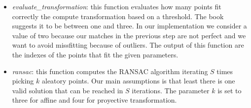 \begin{itemize}
	\item \textit{evaluate\_transformation}: this function evaluates how many points fit correctly the compute transformation based on a threshold. The book suggests it to be between one and three. In our implementation we consider a value of two because our matches in the previous step are not perfect and we want to avoid missfitting because of outliers. The output of this function are the indexes of the points that fit the given parameters.

	\item \textit{ransac}: this function computes the RANSAC algorithm iterating $S$ times picking $k$ aleatory points. Our main assumptions is that least there is one valid solution that can be reached in $S$ iterations. The parameter $k$ is set to three for affine and four for proyective transformation.
\end{itemize}
